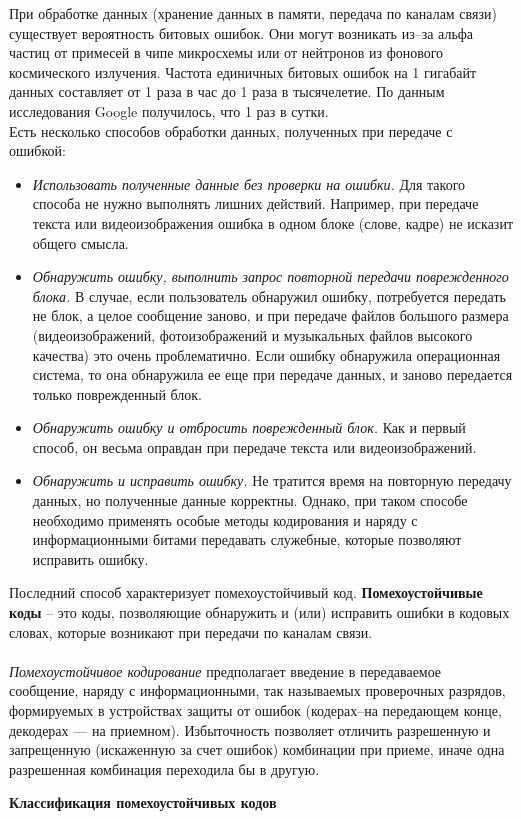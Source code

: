 При обработке данных (хранение данных в памяти, передача по каналам связи) существует вероятность битовых ошибок. Они могут возникать из--за альфа частиц от примесей в чипе микросхемы или от нейтронов из фонового космического излучения. Частота единичных битовых ошибок на 1 гигабайт данных составляет от 1 раза в час до 1 раза в тысячелетие. По данным исследования Google получилось, что 1 раз в сутки.
\\Есть несколько способов обработки данных, полученных при передаче с ошибкой:
\begin{itemize}
  \item \emph{Использовать полученные данные без проверки на ошибки.} Для такого способа не нужно выполнять лишних действий. Например, при передаче текста или видеоизображения ошибка в одном блоке (слове, кадре) не исказит общего смысла.
  \item \emph{Обнаружить ошибку, выполнить запрос повторной передачи поврежденного блока.} В случае, если пользователь обнаружил ошибку, потребуется передать не блок, а целое сообщение заново, и при передаче файлов большого размера (видеоизображений, фотоизображений и музыкальных файлов высокого качества) это очень проблематично. Если ошибку обнаружила операционная система, то она обнаружила ее еще при передаче данных, и заново передается только поврежденный блок.
  \item \emph{Обнаружить ошибку и отбросить поврежденный блок.} Как и первый способ, он весьма оправдан при передаче текста или видеоизображений.
  \item \emph{Обнаружить и исправить ошибку.} Не тратится время на повторную передачу данных, но полученные данные корректны. Однако, при таком способе необходимо применять особые методы кодирования и наряду с информационными битами передавать служебные, которые позволяют исправить ошибку.
\end{itemize}
Последний способ характеризует помехоустойчивый код.
\textbf{Помехоустойчивые коды} -- это коды, позволяющие обнаружить и (или) исправить ошибки в кодовых словах, которые возникают при передачи по каналам связи.\\
\\\emph{Помехоустойчивое кодирование} предполагает введение в передаваемое сообщение, наряду с информационными, так называемых проверочных разрядов, формируемых в устройствах защиты от ошибок (кодерах--на передающем конце, декодерах — на приемном). Избыточность позволяет отличить разрешенную и запрещенную (искаженную за счет ошибок) комбинации при приеме, иначе одна разрешенная комбинация переходила бы в другую.
\begin{center}
  \textbf{Классификация помехоустойчивых кодов}
\end{center}

